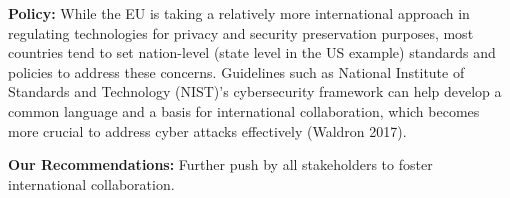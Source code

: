 {\bf Policy:} While the EU is taking a relatively more international approach in regulating technologies for privacy and security preservation purposes, most countries tend to set nation-level (state level in the US example) standards and policies to address these concerns. Guidelines such as National Institute of Standards and Technology (NIST)’s cybersecurity framework can help develop a common language and a basis for international collaboration, which becomes more crucial to address cyber attacks effectively (Waldron 2017).

{\bf Our Recommendations:} Further push by all stakeholders to foster international collaboration.
